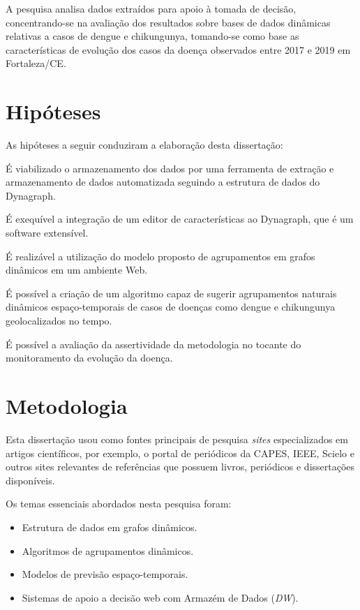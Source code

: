 A pesquisa analisa dados extraídos para apoio à tomada de decisão, concentrando-se na avaliação dos resultados sobre bases de dados dinâmicas relativas a casos de dengue e chikungunya, tomando-se como base as características de evolução dos casos da doença observados entre 2017 e 2019 em Fortaleza/CE.

\section{Hipóteses}
As hipóteses a seguir conduziram a elaboração desta dissertação:
\begin{alineas}
    \item É viabilizado o armazenamento dos dados por uma ferramenta de extração e armazenamento de dados automatizada seguindo a estrutura de dados do Dynagraph.
	\item É exequível a integração de um editor de características ao Dynagraph, que é um software extensível.	
	\item É realizável a utilização do modelo proposto de agrupamentos em grafos dinâmicos em um ambiente Web.	
	\item É possível a criação de um algoritmo capaz de sugerir agrupamentos naturais dinâmicos espaço-temporais de casos de doenças como dengue e chikungunya geolocalizados no tempo.
	\item É possível a avaliação da assertividade da metodologia no tocante do monitoramento da evolução da doença.
\end{alineas}

\section{Metodologia}
Esta dissertação usou como fontes principais de pesquisa \textit{sites} especializados em artigos científicos, por exemplo, o portal de periódicos da \acrshort{CAPES}, \acrshort{IEEE}, Scielo e outros sites relevantes de referências que possuem livros, periódicos e dissertações disponíveis.

Os temas essenciais abordados nesta pesquisa foram:
\begin{itemize}
	\item Estrutura de dados em grafos dinâmicos.
	\item Algoritmos de agrupamentos dinâmicos.
	\item Modelos de previsão espaço-temporais.
	\item Sistemas de apoio a decisão web com Armazém de Dados (\textit{\acrlong{DW}}).
\end{itemize}

